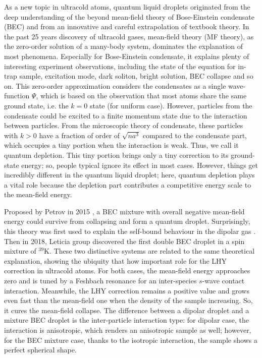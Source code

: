 As a new topic in ultracold atoms, quantum liquid droplets originated from the deep understanding of the beyond mean-field theory of Bose-Einstein condensate (BEC) and from an innovative and careful extrapolation of textbook theory. In the past 25 years discovery of ultracold gases, mean-field theory (MF theory), as the zero-order solution of a many-body system, dominates the explanation of most phenomena. Especially for Bose-Einstein condensate, it explains plenty of interesting experiment observations, including the state of the equation for in-trap sample, excitation mode, dark soliton, bright solution, BEC collapse and so on. This zero-order approximation considers the condensates as a single wave-function \(\Psi\), which is based on the observation that most atoms share the same ground state, i.e. the \(k=0\) state (for uniform case). However, particles from the condensate could be excited to a finite momentum state due to the interaction between particles. From the microscopic theory of condensate, these particles with \(k>0\) have a fraction of order of \(\sqrt{na^3}\) compared to the condensate part, which occupies a tiny portion when the interaction is weak. Thus, we call it quantum depletion. This tiny portion brings only a tiny correction to its ground-state energy; so, people typical ignore its effect in most cases. However, things get incredibly different in the quantum liquid droplet; here, quantum depletion plays a vital role because the depletion part contributes a competitive energy scale to the mean-field energy. 

Proposed by Petrov in 2015 \cite{petrov2015}, a BEC mixture with overall negative mean-field energy could survive from collapsing and form a quantum droplet. Surprisingly, this theory was first used to explain the self-bound behaviour in the dipolar gas \cite{ferrier2016Liquid,chomaz2016}. Then in 2018, Leticia group \cite{cabrera2018quantum} discovered the first double BEC droplet in a spin mixture of \(^{39}\)K. These two distinctive systems are related to the same theoretical explanation, showing the ubiquity that how important role for the LHY correction in ultracold atoms. For both cases, the mean-field energy approaches zero and is tuned by a Feshbach resonance for an inter-species \(s\)-wave contact interaction. Meanwhile, the LHY correction remains a positive value and grows even fast than the mean-field one when the density of the sample increasing. So, it cures the mean-field collapse. The difference between a dipolar droplet and a mixture BEC droplet is the inter-particle interaction type: for dipolar case, the interaction is anisotropic, which renders an anisotropic sample as well; however, for the BEC mixture case, thanks to the isotropic interaction, the sample shows a perfect spherical shape.

